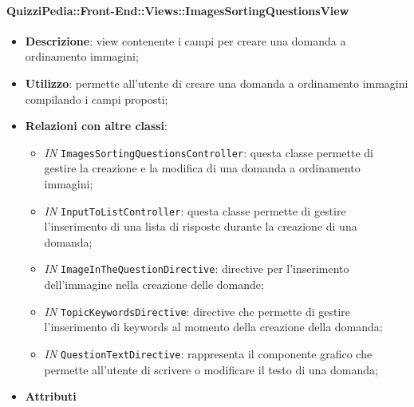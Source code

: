 \paragraph{QuizziPedia::Front-End::Views::ImagesSortingQuestionsView}
\begin{itemize}
	\item \textbf{Descrizione}: view contenente i campi per creare una domanda a ordinamento immagini;
	\item \textbf{Utilizzo}: permette all'utente di creare una domanda a ordinamento immagini compilando i campi proposti;
	\item \textbf{Relazioni con altre classi}:
	\begin{itemize}
		\item \textit{IN} \texttt{ImagesSortingQuestionsController}: questa classe permette di gestire la creazione e la modifica di una domanda a ordinamento immagini;
		\item \textit{IN} \texttt{InputToListController}: questa classe permette di gestire l'inserimento di una lista di risposte durante la creazione di una domanda;
		\item \textit{IN} \texttt{ImageInTheQuestionDirective}: directive per l'inserimento dell'immagine nella creazione delle domande;
		\item \textit{IN} \texttt{TopicKeywordsDirective}: directive che permette di gestire l'inserimento di keywords al momento della creazione della domanda;
		\item \textit{IN} \texttt{QuestionTextDirective}: rappresenta il componente grafico che permette all'utente di scrivere o modificare il testo di una domanda;
	\end{itemize}
	\item \textbf{Attributi}
\end{itemize}

